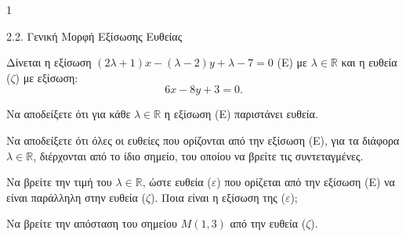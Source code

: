 \begin{ylh}{1}
    \item 2.2. Γενική Μορφή Εξίσωσης Ευθείας
\end{ylh}
Δίνεται η εξίσωση $(2\lambda+1)x - (\lambda - 2)y + \lambda - 7 = 0$ (E) με $\lambda \in \mathbb{R}$ και η ευθεία ($\zeta$) με εξίσωση:
\[ 6x - 8y + 3 = 0. \]
\begin{alist}
\item Να αποδείξετε ότι για κάθε $\lambda \in \mathbb{R}$ η εξίσωση (Ε) παριστάνει ευθεία. 
\item Να αποδείξετε ότι όλες οι ευθείες που ορίζονται από την εξίσωση (Ε), για τα διάφορα $\lambda \in \mathbb{R}$, διέρχονται από το ίδιο σημείο, του οποίου να βρείτε τις συντεταγμένες. 
\item Να βρείτε την τιμή του $\lambda \in \mathbb{R}$, ώστε ευθεία ($\varepsilon$) που ορίζεται από την εξίσωση (Ε) να είναι παράλληλη στην ευθεία ($\zeta$). Ποια είναι η εξίσωση της ($\varepsilon$); 
\item Να βρείτε την απόσταση του σημείου $M(1,3)$ από την ευθεία ($\zeta$). 
\end{alist}